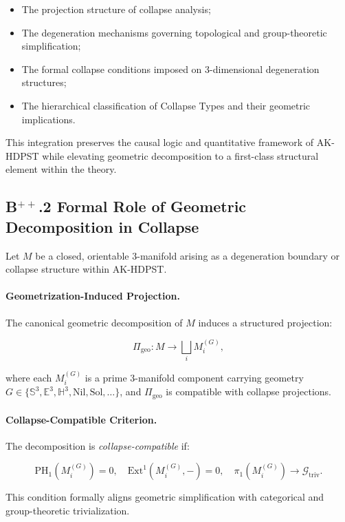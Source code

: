 \documentclass[11pt]{article}
\begin{document}
\begin{itemize}
    \item The projection structure of collapse analysis;
    \item The degeneration mechanisms governing topological and group-theoretic simplification;
    \item The formal collapse conditions imposed on 3-dimensional degeneration structures;
    \item The hierarchical classification of Collapse Types and their geometric implications.
\end{itemize}

This integration preserves the causal logic and quantitative framework of AK-HDPST while elevating geometric decomposition to a first-class structural element within the theory.

\subsection*{B$^{++}$.2 Formal Role of Geometric Decomposition in Collapse}

Let $M$ be a closed, orientable 3-manifold arising as a degeneration boundary or collapse structure within AK-HDPST.

\paragraph{Geometrization-Induced Projection.}
The canonical geometric decomposition of $M$ induces a structured projection:

\[
\Pi_{\mathrm{geo}} : M \longrightarrow \bigsqcup_i M_i^{(G)},
\]

where each $M_i^{(G)}$ is a prime 3-manifold component carrying geometry $G \in \{ \mathbb{S}^3, \mathbb{E}^3, \mathbb{H}^3, \mathrm{Nil}, \mathrm{Sol}, \ldots \}$, and $\Pi_{\mathrm{geo}}$ is compatible with collapse projections.

\paragraph{Collapse-Compatible Criterion.}
The decomposition is \emph{collapse-compatible} if:

\[
\mathrm{PH}_1(M_i^{(G)}) = 0,\quad \mathrm{Ext}^1(M_i^{(G)}, -) = 0,\quad \pi_1(M_i^{(G)}) \longrightarrow \mathcal{G}_{\mathrm{triv}}.
\]

This condition formally aligns geometric simplification with categorical and group-theoretic trivialization.
\end{document}
